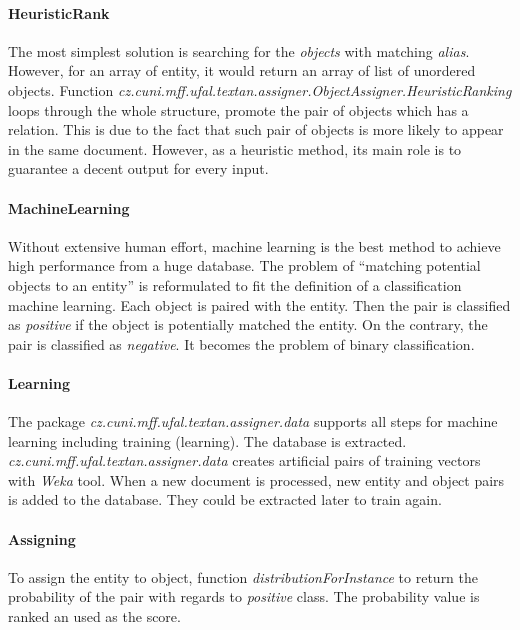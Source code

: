 \paragraph{HeuristicRank}
The most simplest solution is searching for the \textit{objects} with matching 
\textit{alias}. However, for an array of entity, it would return an array of 
list of unordered objects.
Function \emph{cz.cuni.mff.ufal.textan.assigner.ObjectAssigner.HeuristicRanking}
loops through the whole structure, promote the pair of objects which has a relation. This is due to the fact that such pair of objects is more likely to appear in the same document. However, as a heuristic method, its main role is to guarantee a decent output for every input.


\paragraph{MachineLearning}
Without extensive human effort, machine learning is the best method to achieve
high performance from a huge database. The problem of ``matching potential objects
to an entity'' is reformulated to fit the definition of a classification machine 
learning. Each object is paired with the entity. Then the pair is classified as
\emph{positive} if the object is potentially matched the entity. On the contrary,
the pair is classified as \emph{negative}. It becomes the problem of binary 
classification.


\paragraph{Learning}
The package \emph{cz.cuni.mff.ufal.textan.assigner.data} supports all steps for
machine learning including training (learning). The database is extracted. 
\emph{cz.cuni.mff.ufal.textan.assigner.data} creates 
artificial pairs of training vectors with \textit{Weka} tool. When a new document is
processed, new entity and object pairs is added to the database. They could be extracted
later to train again.

\paragraph{Assigning}
To assign the entity to object, function \emph{distributionForInstance} to return the 
probability of the pair with regards to \emph{positive} class. The probability value 
is ranked an used as the score.

